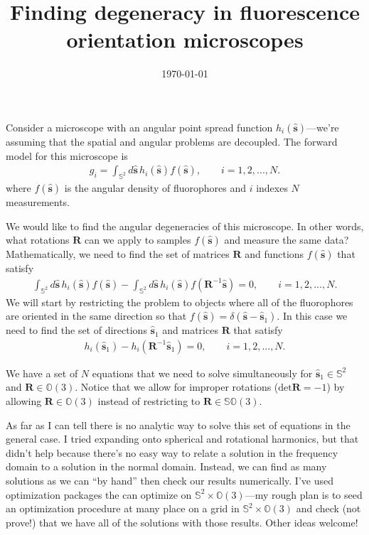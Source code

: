 \documentclass[11pt]{article}
\providecommand{\mb}[1]{\mathbf{#1}}
\providecommand{\so}[1]{\mathbf{\hat{s}}_1}
\providecommand{\s}[1]{\mathbf{\hat{s}}}
\begin{document}
\title{\vspace{-2.5em} Finding degeneracy in fluorescence orientation microscopes \vspace{-1em}}  \vspace{-2em} \author{}
\date{\vspace{-3em}\today\vspace{-2em}}
\maketitle

Consider a microscope with an angular point spread function $h_i(\s{})$---we're
assuming that the spatial and angular problems are decoupled. The forward model for
this microscope is
\begin{align}
  g_i = \int_{\mathbb{S}^2}d\s{}\, h_i(\s{})f(\s{}), \qquad i=1, 2, ..., N.
\end{align}
where $f(\s{})$ is the angular density of fluorophores and $i$ indexes $N$
measurements.

We would like to find the angular degeneracies of this microscope. In other
words, what rotations $\mb{R}$ can we apply to samples $f(\s{})$ and measure
the same data? Mathematically, we need to find the set of matrices $\mb{R}$ and
functions $f(\s{})$ that satisfy
\begin{align}
  \int_{\mathbb{S}^2}d\s{}\, h_i(\s{})f(\s{}) - \int_{\mathbb{S}^2}d\s{}\, h_i(\s{})f(\mb{R}^{-1}\s{}) = 0, \qquad i=1, 2, ..., N. \label{eq:tosolve}
\end{align}
We will start by restricting the problem to objects where all of the
fluorophores are oriented in the same direction so that
$f(\s{}) = \delta(\s{} - \so{})$. In this case we need to find the set of
directions $\so{}$ and matrices $\mb{R}$ that satisfy
\begin{align}
  h_i(\so{}) - h_i(\mb{R}^{-1}\so{}) = 0, \qquad i=1, 2, ..., N. \label{eq:tosolve2}
\end{align}

We have a set of $N$ equations that we need to solve simultaneously for
$\so{} \in \mathbb{S}^2$ and $\mb{R} \in \mathbb{O}(3)$. Notice that we allow
for improper rotations ($\text{det}\mb{R} = -1$) by allowing $\mb{R} \in \mathbb{O}(3)$
instead of restricting to $\mb{R} \in \mathbb{SO}(3)$.

As far as I can tell there is no analytic way to solve this set of equations in
the general case. I tried expanding onto spherical and rotational harmonics, but
that didn't help because there's no easy way to relate a solution in the
frequency domain to a solution in the normal domain. Instead, we can find as
many solutions as we can ``by hand'' then check our results numerically. I've
used optimization packages the can optimize on
$\mathbb{S}^2\times \mathbb{O}(3)$---my rough plan is to seed an optimization
procedure at many place on a grid in $\mathbb{S}^2\times \mathbb{O}(3)$ and
check (not prove!) that we have all of the solutions with those results. Other
ideas welcome!
\end{document}
